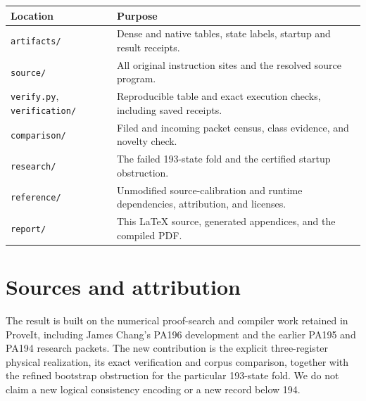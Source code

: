 \documentclass[11pt]{article}
\newcommand{\file}[1]{\nolinkurl{#1}}
\begin{document}
\begin{center}
\begin{tabular}{@{}p{}p{}@{}}
\toprule Location & Purpose\\\midrule
\file{artifacts/} & Dense and native tables, state labels, startup and result receipts.\\
\file{source/} & All original instruction sites and the resolved source program.\\
\file{verify.py}, \file{verification/} & Reproducible table and exact execution checks, including saved receipts.\\
\file{comparison/} & Filed and incoming packet census, class evidence, and novelty check.\\
\file{research/} & The failed 193-state fold and the certified startup obstruction.\\
\file{reference/} & Unmodified source-calibration and runtime dependencies, attribution, and licenses.\\
\file{report/} & This LaTeX source, generated appendices, and the compiled PDF.\\
\bottomrule
\end{tabular}
\end{center}

\section{Sources and attribution}
The result is built on the numerical proof-search and compiler work retained
in ProveIt, including James Chang's PA196 development and the earlier PA195
and PA194 research packets. The new contribution is the explicit three-register
physical realization, its exact verification and corpus comparison, together
with the refined bootstrap obstruction for the particular 193-state fold.
We do not claim a new logical consistency encoding or a new record below 194.
\end{document}
